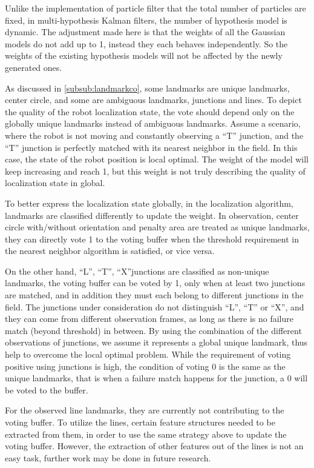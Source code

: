 Unlike the implementation of particle filter that the total number of particles are fixed, in multi-hypothesis Kalman filters, the number of hypothesis model is dynamic. The adjustment made here is that the weights of all the Gaussian models do not add up to 1, instead they each behaves independently. So the weights of the existing hypothesis models will not be affected by the newly generated ones.

As discussed in \autoref{subsub:landmarkco}, some landmarks are unique landmarks, \ie center circle, and some are ambiguous landmarks, \ie junctions and lines. To depict the quality of the robot localization state, the vote should depend only on the globally unique landmarks instead of ambiguous landmarks. Assume a scenario, where the robot is not moving and constantly observing a ``T'' junction, and the ``T'' junction is perfectly matched with its nearest neighbor in the field. In this case, the state of the robot position is local optimal. The weight of the model will keep increasing and reach 1, but this weight is not truly describing the quality of localization state in global. 

To better express the localization state globally, in the localization algorithm, landmarks are classified differently to update the weight. In observation, center circle with/without orientation and penalty area are treated as unique landmarks, they can directly vote 1 to the voting buffer when the threshold requirement in the nearest neighbor algorithm is satisfied, or vice versa. 

On the other hand, ``L'', ``T'', ``X''junctions are classified as non-unique landmarks, the voting buffer can be voted by 1, only when at least two junctions are matched, and in addition they must each belong to different junctions in the field. The junctions under consideration do not distinguish ``L'', ``T'' or ``X'', and they can come from different observation frames, as long as there is no failure match (beyond threshold) in between. By using the combination of the different observations of junctions, we assume it represents a global unique landmark, thus help to overcome the local optimal problem. While the requirement of voting positive using junctions is high, the condition of voting 0 is the same as the unique landmarks, that is when a failure match happens for the junction, a 0 will be voted to the buffer.  

For the observed line landmarks, they are currently not contributing to the voting buffer. To utilize the lines, certain feature structures needed to be extracted from them, in order to use the same strategy above to update the voting buffer. However, the extraction of other features out of the lines is not an easy task, further work may be done in future research. 


